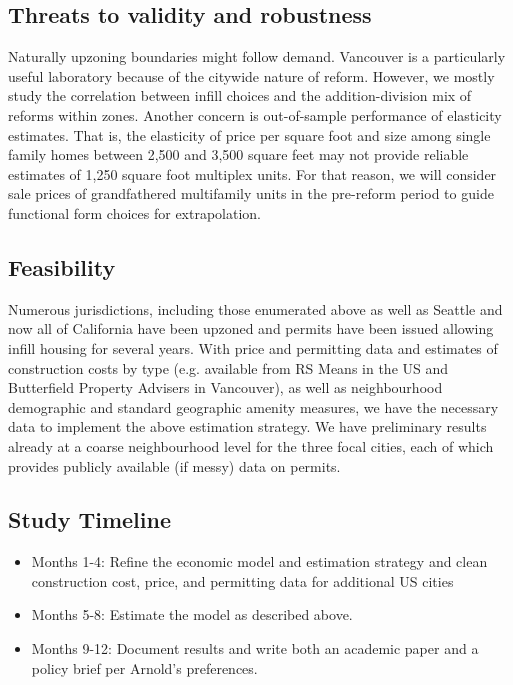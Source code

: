 \documentclass[12pt]{article}
\begin{document}
\subsection{Threats to validity and robustness}

Naturally upzoning boundaries might follow demand. Vancouver is a particularly useful laboratory because of the citywide nature of reform. However, we mostly study the correlation between infill choices and the addition-division mix of reforms within zones. Another concern is out-of-sample performance of elasticity estimates. That is, the elasticity of price per square foot and size among single family homes between 2,500 and 3,500 square feet may not provide reliable estimates of 1,250 square foot multiplex units. For that reason, we will consider sale prices of grandfathered multifamily units in the pre-reform period to guide functional form choices for extrapolation.

\subsection{Feasibility}

Numerous jurisdictions, including those enumerated above as well as Seattle and now all of California have been upzoned and permits have been issued allowing infill housing for several years. With price and permitting data and estimates of construction costs by type (e.g. available from RS Means in the US and Butterfield Property Advisers in Vancouver), as well as neighbourhood demographic and standard geographic amenity measures, we have the necessary data to implement the above estimation strategy. We have preliminary results already at a coarse neighbourhood level for the three focal cities, each of which provides publicly available (if messy) data on permits.

\subsection{Study Timeline}

\begin{itemize}
	\item Months 1-4: Refine the economic model and estimation strategy and clean construction cost, price, and permitting data for additional US cities
	\item Months 5-8: Estimate the model as described above.
	\item Months 9-12: Document results and write both an academic paper and a policy brief per Arnold's preferences.
\end{itemize}
\end{document}
